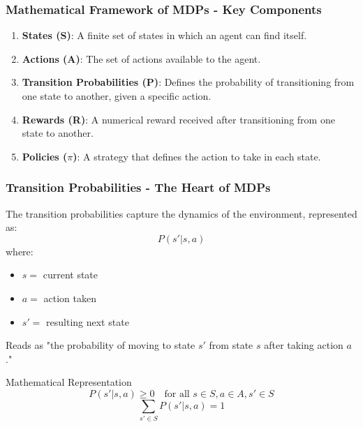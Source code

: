 \documentclass[aspectratio=169]{beamer}
\begin{document}
\begin{frame}[fragile]
    \frametitle{Mathematical Framework of MDPs - Key Components}
    \begin{enumerate}
        \item \textbf{States (S)}: A finite set of states in which an agent can find itself.
        \item \textbf{Actions (A)}: The set of actions available to the agent.
        \item \textbf{Transition Probabilities (P)}: Defines the probability of transitioning from one state to another, given a specific action.
        \item \textbf{Rewards (R)}: A numerical reward received after transitioning from one state to another.
        \item \textbf{Policies ($\pi$)}: A strategy that defines the action to take in each state.
    \end{enumerate}
\end{frame}

\begin{frame}[fragile]
    \frametitle{Transition Probabilities - The Heart of MDPs}
    The transition probabilities capture the dynamics of the environment, represented as:
    \begin{equation}
        P(s' | s, a)
    \end{equation}
    where:
    \begin{itemize}
        \item $s =$ current state
        \item $a =$ action taken
        \item $s' =$ resulting next state
    \end{itemize}
    Reads as "the probability of moving to state $s'$ from state $s$ after taking action $a$."

    \begin{block}{Mathematical Representation}
        \begin{equation}
            P(s' | s, a) \geq 0 \quad \text{for all } s \in S, a \in A, s' \in S
        \end{equation}
        \begin{equation}
            \sum_{s' \in S} P(s' | s, a) = 1
        \end{equation}
    \end{block}
\end{frame}
\end{document}
